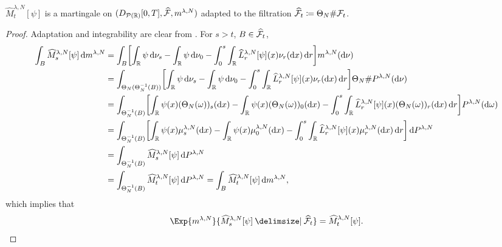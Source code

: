 \documentclass{article}
\begin{document}
\begin{corollary}\label{cor:hat-M-mart}
  $\widehat{M}_t^{\lambda, N}[\psi]$ is a martingale on $(D_{\mathcal{P}(\mathbb{R})}[0,T], \widehat{\mathcal{F}}, m^{\lambda,N})$ adapted to the filtration $\widehat{\mathcal{F}}_t \coloneqq \Theta_N \# \mathcal{F}_t$.
\end{corollary}
\begin{proof}
  Adaptation and integrability are clear from .
  For $s > t$, $B \in \widehat{\mathcal{F}}_t$,
  \begin{equation}
    \begin{split}
      \int_B \widehat{M}_{s}^{\lambda, N}[\psi] \odif{\lawmu^{\lambda,N}}
       & = \int_B \sbr*{ \int_\potspace \psi \odif{\nu_s} - \int_\potspace \psi \odif{\nu_0} - \int_0^s \int_\potspace \widehat{L}_r^{\lambda, N} [\psi](x) \nu_{r}(\odif{x}) \odif{r} } \lawmu^{\lambda,N} (\odif{\nu})                                                                          \\
       & = \int_{\Theta_N(\Theta_N^{-1}(B))} \sbr*{ \int_\potspace \psi \odif{\nu_s} - \int_\potspace \psi \odif{\nu_0} - \int_0^s \int_\potspace \widehat{L}_r^{\lambda, N} [\psi](x) \nu_{r}(\odif{x}) \odif{r} } \Theta_N \# P^{\lambda, N} (\odif{\nu})                                       \\
       & = \int_{\Theta_N^{-1}(B)} \sbr*{ \int_\potspace \psi(x) (\Theta_N(\omega))_s(\odif{x}) - \int_\potspace \psi(x) (\Theta_N(\omega))_0(\odif{x}) - \int_0^s \int_\potspace \widehat{L}_r^{\lambda, N} [\psi](x) (\Theta_N(\omega))_{r}(\odif{x}) \odif{r} } P^{\lambda, N} (\odif{\omega}) \\
       & = \int_{\Theta_N^{-1}(B)} \sbr*{ \int_\potspace \psi(x) \mu_s^{\lambda,N}(\odif{x}) - \int_\potspace \psi(x) \mu_0^{\lambda,N}(\odif{x}) - \int_0^s \int_\potspace \widehat{L}_r^{\lambda, N} [\psi](x) \mu_{r}^{\lambda,N}(\odif{x}) \odif{r} } \odif{P^{\lambda, N}}                   \\
       & = \int_{\Theta_N^{-1}(B)} \widehat{M}_s^{\lambda, N}[\psi] \odif{P^{\lambda, N}}                                                                                                                                                                                                         \\
       & = \int_{\Theta_N^{-1}(B)} \widehat{M}_t^{\lambda, N}[\psi] \odif{P^{\lambda, N}}
      = \int_B \widehat{M}_t^{\lambda, N}[\psi] \odif{\lawmu^{\lambda,N}},
    \end{split}
  \end{equation}
  which implies that
  \begin{equation}
    \Exp{\lawmu^{\lambda,N}}{\widehat{M}_{s}^{\lambda, N}[\psi] \given \widehat{\cF}_t} = \widehat{M}_t^{\lambda, N}[\psi].
  \end{equation}
\end{proof}
\end{document}
